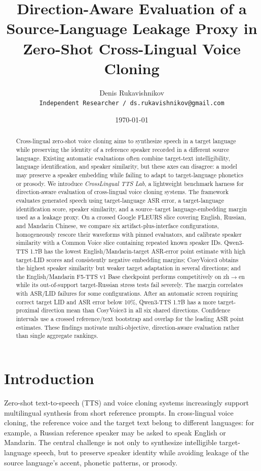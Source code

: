 \documentclass[11pt]{article}
\title{Direction-Aware Evaluation of a Source-Language Leakage Proxy in Zero-Shot Cross-Lingual Voice Cloning}
\author{
    Denis Rukavishnikov\\
    \texttt{Independent Researcher / ds.rukavishnikov@gmail.com}
}
\date{\today}
\begin{document}
\maketitle

\begin{abstract}
Cross-lingual zero-shot voice cloning aims to synthesize speech in a target language while preserving the identity of a reference speaker recorded in a different source language. Existing automatic evaluations often combine target-text intelligibility, language identification, and speaker similarity, but these axes can disagree: a model may preserve a speaker embedding while failing to adapt to target-language phonetics or prosody. We introduce \textit{CrossLingual TTS Lab}, a lightweight benchmark harness for direction-aware evaluation of cross-lingual voice cloning systems. The framework evaluates generated speech using target-language ASR error, a target-language identification score, speaker similarity, and a source--target language-embedding margin used as a leakage proxy. On a crossed Google FLEURS slice covering English, Russian, and Mandarin Chinese, we compare six artifact-plus-interface configurations, homogeneously rescore their waveforms with pinned evaluators, and calibrate speaker similarity with a Common Voice slice containing repeated known speaker IDs. Qwen3-TTS 1.7B has the lowest English/Mandarin-target ASR-error point estimate with high target-LID scores and consistently negative embedding margins; CosyVoice3 obtains the highest speaker similarity but weaker target adaptation in several directions; and the English/Mandarin F5-TTS v1 Base checkpoint performs competitively on zh$\rightarrow$en while its out-of-support target-Russian stress tests fail severely. The margin correlates with ASR/LID failures for some configurations. After an automatic screen requiring correct target LID and ASR error below 10\%, Qwen3-TTS 1.7B has a more target-proximal direction mean than CosyVoice3 in all six shared directions. Confidence intervals use a crossed reference/text bootstrap and overlap for the leading ASR point estimates. These findings motivate multi-objective, direction-aware evaluation rather than single aggregate rankings.
\end{abstract}

\section{Introduction}

Zero-shot text-to-speech (TTS) and voice cloning systems increasingly support multilingual synthesis from short reference prompts. In cross-lingual voice cloning, the reference voice and the target text belong to different languages: for example, a Russian reference speaker may be asked to speak English or Mandarin. The central challenge is not only to synthesize intelligible target-language speech, but to preserve speaker identity while avoiding leakage of the source language's accent, phonetic patterns, or prosody.
\end{document}
